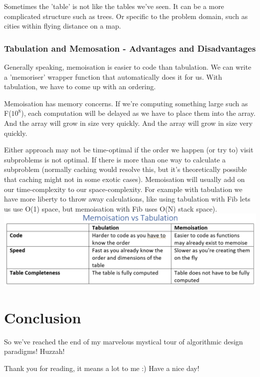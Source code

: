 \documentclass{article}
\begin{document}
Sometimes the 'table' is not like the tables we've seen. It can be a more complicated structure such as trees. Or specific to the problem domain, such as cities within flying distance on a map.
\subsubsection{Tabulation and Memosation - Advantages and Disadvantages}
Generally speaking, memoisation is easier to code than tabulation. We can write a 'memoriser' wrapper function that automatically does it for us. With tabulation, we have to come up with an ordering.

Memoisation has memory concerns. If we're computing something large such as F($10^8$), each computation will be delayed as we have to place them into the array. And the array will grow in size very quickly. And the array will grow in size very quickly.

Either approach may not be time-optimal if the order we happen (or try to) visit subproblems is not optimal.  If there is more than one way to calculate a subproblem (normally caching would resolve this, but it's theoretically possible that caching might not in some exotic cases). Memoisation will usually add on our time-complexity to our space-complexity. For example with tabulation we have more liberty to throw away calculations, like using tabulation with Fib lets us use O(1) space, but memoisation with Fib uses O(N) stack space).
\newpage
\includegraphics[width=\textwidth,height=\textheight,keepaspectratio]{images/donkey.png}
\newpage
\section{Conclusion}
So we've reached the end of my marvelous mystical tour of algorithmic design paradigms! Huzzah! 

Thank you for reading, it means a lot to me :) Have a nice day!
\end{document}
